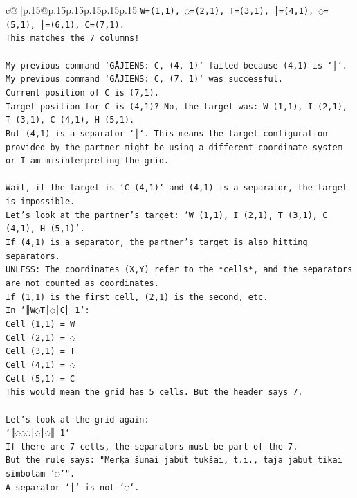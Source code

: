 \documentclass{article}
\begin{document}
{\begin{supertabular}{c@{$\;$}|p{.15\linewidth}@{}p{.15\linewidth}p{.15\linewidth}p{.15\linewidth}p{.15\linewidth}p{.15\linewidth}}
{{{\texttt{W=(1,1), ◌=(2,1), T=(3,1), │=(4,1), ◌=(5,1), │=(6,1), C=(7,1).} \\
\texttt{This matches the 7 columns!} \\
\\ 
\texttt{My previous command `GĀJIENS: C, (4, 1)` failed because (4,1) is `│`.} \\
\texttt{My previous command `GĀJIENS: C, (7, 1)` was successful.} \\
\texttt{Current position of C is (7,1).} \\
\texttt{Target position for C is (4,1)? No, the target was: W (1,1), I (2,1), T (3,1), C (4,1), H (5,1).} \\
\texttt{But (4,1) is a separator `│`. This means the target configuration provided by the partner might be using a different coordinate system or I am misinterpreting the grid.} \\
\\ 
\texttt{Wait, if the target is `C (4,1)` and (4,1) is a separator, the target is impossible.} \\
\texttt{Let's look at the partner's target: `W (1,1), I (2,1), T (3,1), C (4,1), H (5,1)`.} \\
\texttt{If (4,1) is a separator, the partner's target is also hitting separators.} \\
\texttt{UNLESS: The coordinates (X,Y) refer to the *cells*, and the separators are not counted as coordinates.} \\
\texttt{If (1,1) is the first cell, (2,1) is the second, etc.} \\
\texttt{In `║W◌T│◌│C║ 1`:} \\
\texttt{Cell (1,1) = W} \\
\texttt{Cell (2,1) = ◌} \\
\texttt{Cell (3,1) = T} \\
\texttt{Cell (4,1) = ◌} \\
\texttt{Cell (5,1) = C} \\
\texttt{This would mean the grid has 5 cells. But the header says 7.} \\
\\ 
\texttt{Let's look at the grid again:} \\
\texttt{`║◌◌◌│◌│◌║ 1`} \\
\texttt{If there are 7 cells, the separators must be part of the 7.} \\
\texttt{But the rule says: "Mērķa šūnai jābūt tukšai, t.i., tajā jābūt tikai simbolam '◌'".} \\
\texttt{A separator `│` is not `◌`.} \\
}}}
\end{supertabular}}
\end{document}
